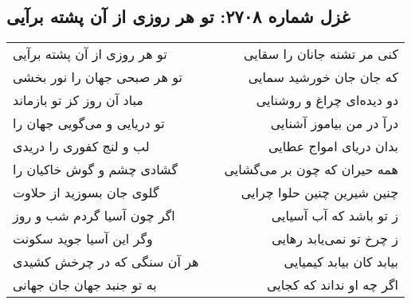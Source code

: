 \begin{center}
\section*{غزل شماره ۲۷۰۸: تو هر روزی از آن پشته برآیی}
\label{sec:2708}
\begin{longtable}{l p{0.5cm} r}
تو هر روزی از آن پشته برآیی
&&
کنی مر تشنه جانان را سقایی
\\
تو هر صبحی جهان را نور بخشی
&&
که جان جان خورشید سمایی
\\
مباد آن روز کز تو بازماند
&&
دو دیده‌ای چراغ و روشنایی
\\
تو دریایی و می‌گویی جهان را
&&
درآ در من بیاموز آشنایی
\\
لب و لنج کفوری را دریدی
&&
بدان دریای امواج عطایی
\\
گشادی چشم و گوش خاکیان را
&&
همه حیران که چون بر می‌گشایی
\\
گلوی جان بسوزید از حلاوت
&&
چنین شیرین چنین حلوا چرایی
\\
اگر چون آسیا گردم شب و روز
&&
ز تو باشد که آب آسیایی
\\
وگر این آسیا جوید سکونت
&&
ز چرخ تو نمی‌یابد رهایی
\\
هر آن سنگی که در چرخش کشیدی
&&
بیابد کان بیابد کیمیایی
\\
به تو جنبد جهان جان جهانی
&&
اگر چه او نداند که کجایی
\\
\end{longtable}
\end{center}

